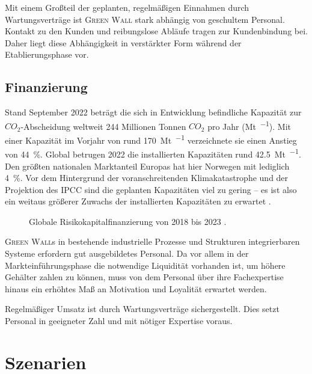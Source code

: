 Mit einem Großteil der geplanten, regelmäßigen Einnahmen durch Wartungsverträge ist \textsc{Green Wall} stark abhängig von geschultem Personal.
Kontakt zu den Kunden und reibungslose Abläufe tragen zur Kundenbindung bei.
Daher liegt diese Abhängigkeit in verstärkter Form während der Etablierungsphase vor.\par


\subsection{Finanzierung}

Stand September 2022 beträgt die sich in Entwicklung befindliche Kapazität zur \(CO_2\)-Abscheidung weltweit \num{244} Millionen Tonnen \(CO_2\) pro Jahr (\unit{\mega\tonne\per\an}).
Mit einer Kapazität im Vorjahr von rund \qty{170}{\mega\tonne\per\an} verzeichnete sie einen Anstieg von \qty{44}{\percent}.
Global betrugen 2022 die installierten Kapazitäten rund \qty{42.5}{\mega\tonne\per\an}.
Den größten nationalen Marktanteil Europas hat hier Norwegen mit lediglich \qty{4}{\percent}.
Vor dem Hintergrund der voranschreitenden Klimakatastrophe und der Projektion des IPCC sind die geplanten Kapazitäten viel zu gering -- es ist also ein weitaus größerer Zuwachs der installierten Kapazitäten zu erwartet \cite{Book.EJR.CARBONCAPTUREUTILISATIONANDSTORAGEINTHEEUROPEANUNION.2023}.\par\medskip
%
\begin{figure}[h]
    \centering
    
    \caption[Globale Risikokapitalfinanzierung von 2018 bis 2023]{Globale Risikokapitalfinanzierung von 2018 bis 2023 \cite{Statista2022.GlobalVentureCapital}.}\label{fig:glob ccus vc inv}
\end{figure}

\textsc{Green Wall}s in bestehende industrielle Prozesse und Strukturen integrierbaren Systeme erfordern gut ausgebildetes Personal.
Da vor allem in der Markteinführungsphase die notwendige Liquidität vorhanden ist, um höhere Gehälter zahlen zu können, muss von dem Personal über ihre Fachexpertise hinaus ein erhöhtes Maß an Motivation und Loyalität erwartet werden.\par\medskip

Regelmäßiger Umsatz ist durch Wartungsverträge sichergestellt.
Dies setzt Personal in geeigneter Zahl und mit nötiger Expertise voraus.

\section{Szenarien}

